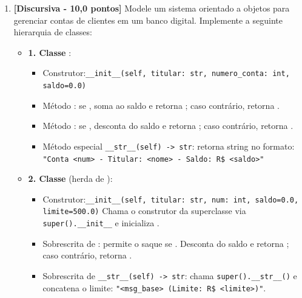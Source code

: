\begin{enumerate}[label=\textbf{Q\arabic*.}, start=1]
\item \textbf{[Discursiva - 10,0 pontos]} Modele um sistema orientado a objetos para gerenciar contas de clientes em um banco digital. Implemente a seguinte hierarquia de classes:

\begin{itemize}[leftmargin=*]
    \item \textbf{1. Classe }:\newline
    \begin{itemize}
        \item Construtor:\newline \texttt{\_\_init\_\_(self, titular: str, numero\_conta: int, saldo=0.0)}
        \item Método : se , soma ao saldo e retorna ; caso contrário, retorna .
        \item Método : se , desconta do saldo e retorna ; caso contrário, retorna .
        \item Método especial \texttt{\_\_str\_\_(self) -> str}: retorna string no formato:\newline
        \texttt{"Conta <num> - Titular: <nome> - Saldo: R\$ <saldo>"}
    \end{itemize}
    \item \textbf{2. Classe } (herda de ):\newline
    \begin{itemize}
        \item Construtor:\newline \texttt{\_\_init\_\_(self, titular: str, num: int, saldo=0.0, limite=500.0)}\newline
        Chama o construtor da superclasse via \texttt{super().\_\_init\_\_} e inicializa .
        \item Sobrescrita de : permite o saque se . Desconta do saldo e retorna ; caso contrário, retorna .
        \item Sobrescrita de \texttt{\_\_str\_\_(self) -> str}: chama \texttt{super().\_\_str\_\_()} e concatena o limite: \texttt{"<msg\_base> (Limite: R\$ <limite>)"}.
    \end{itemize}
\end{itemize}


\end{enumerate}
